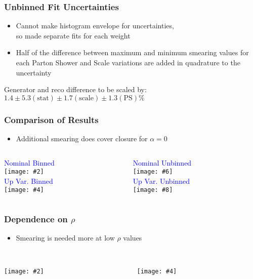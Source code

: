 \documentclass{beamer}
\newcommand{\twofigs}[4]{
  \begin{columns}
    \begin{column}{0.5\linewidth}
      \centering
      \textcolor{blue}{#1} \\
      \texttt{[image: \#2]}
    \end{column}
    \begin{column}{0.5\linewidth}
      \centering
      \textcolor{blue}{#3} \\
      \texttt{[image: \#4]}
    \end{column}
  \end{columns}
}
\newcommand{\fourfigs}[8]{
  \begin{columns}
    \begin{column}{0.3\linewidth}
      \centering
      \textcolor{blue}{#1} \\
      \texttt{[image: \#2]} \\
      \textcolor{blue}{#3} \\
      \texttt{[image: \#4]}
    \end{column}
    \begin{column}{0.3\linewidth}
      \centering
      \textcolor{blue}{#5} \\
      \texttt{[image: \#6]} \\
      \textcolor{blue}{#7} \\
      \texttt{[image: \#8]}
    \end{column}
  \end{columns}
}
\begin{document}
\begin{frame}
  \frametitle{Unbinned Fit Uncertainties}

  \begin{itemize}
  \item Cannot make histogram envelope for uncertainties, \\
    so made separate fits for each weight
  \item Half of the difference between maximum and minimum smearing values for each
    Parton Shower and Scale variations are added in quadrature to the uncertainty
  \end{itemize}

  \vfill

  \centering
  Generator and reco difference to be scaled by: $1.4 \pm 5.3 (\mathrm{stat}) \pm 1.7 (\mathrm{scale}) \pm 1.3 (\mathrm{PS}) \%$

\end{frame}


\begin{frame}
  \frametitle{Comparison of Results}

  \begin{itemize}
  \item Additional smearing does cover closure for $\alpha = 0$
  \end{itemize}

  \vfill

  \fourfigs{Nominal Binned}
           {200303_smear_200303_cb/resolution_jet1_response_single_scale_nominal_smear_0.pdf}
           {Up Var. Binned}
           {200303_smear_200303_cb/resolution_jet1_response_single_scale_up_smear_0.pdf}
           {Nominal Unbinned}
           {200303_smear_200303_cb/resolution_jet1_response_unbinned_scale_nominal_smear_0.pdf}
           {Up Var. Unbinned}
           {200303_smear_200303_cb/resolution_jet1_response_unbinned_scale_up_smear_0.pdf}

\end{frame}


\begin{frame}
  \frametitle{Dependence on $\rho$}

  \begin{itemize}
  \item Smearing is needed more at low $\rho$ values    
  \end{itemize}

  \vfill

  \twofigs{}
          {200303_rho_200303_cb/resolution_jet1_response_rho_0.pdf}
          {}
          {200303_rho_200303_cb/resolution_jet1_response_rho_1.pdf}

\end{frame}
\end{document}
